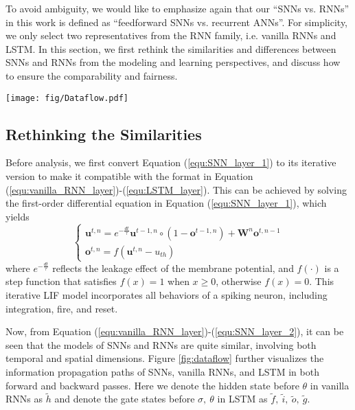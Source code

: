 \documentclass[journal,10pt,twocolumn]{IEEETran}
\begin{document}
To avoid ambiguity, we would like to emphasize again that our ``SNNs vs. RNNs'' in this work is defined as ``feedforward SNNs vs. recurrent ANNs''. For simplicity, we only select two representatives from the RNN family, i.e. vanilla RNNs and LSTM. In this section, we first rethink the similarities and differences between SNNs and RNNs from the modeling and learning perspectives, and discuss how to ensure the comparability and fairness.

\begin{figure*}[!htbp]
\centering     
\texttt{[image: fig/Dataflow.pdf]}
\vspace{-10pt}
\caption{\textbf{Information propagation paths of (a) SNNs, (b) vanilla RNNs, and (c) LSTM in both forward and backward passes.} For clarity, we do not show the dataflow inside LSTM neurons.}
\label{fig:dataflow} 
\end{figure*}

\subsection{Rethinking the Similarities}

Before analysis, we first convert Equation (\ref{equ:SNN_layer_1}) to its iterative version to make it compatible with the format in Equation (\ref{equ:vanilla_RNN_layer})-(\ref{equ:LSTM_layer}). This can be achieved by solving the first-order differential equation in Equation (\ref{equ:SNN_layer_1}), which yields
\begin{equation}
    \label{equ:SNN_layer_2}
    \begin{cases}
    \pmb{u}^{t,n}= e^{-\frac{dt}{\tau}}\pmb{u}^{t-1,n}\circ(1-\pmb{o}^{t-1,n}) + \pmb{W}^{n}\pmb{o}^{t,n-1} \\
    \pmb{o}^{t,n}= f(\pmb{u}^{t,n}-u_{th})
    \end{cases}
\end{equation}
where $e^{-\frac{dt}{\tau}}$ reflects the leakage effect of the membrane potential, and $f(\cdot)$ is a step function that satisfies $f(x)=1$ when $x\geq 0$, otherwise $f(x)=0$. This iterative LIF model incorporates all behaviors of a spiking neuron, including integration, fire, and reset. 

Now, from Equation (\ref{equ:vanilla_RNN_layer})-(\ref{equ:SNN_layer_2}), it can be seen that the models of SNNs and RNNs are quite similar, involving both temporal and spatial dimensions. Figure \ref{fig:dataflow} further visualizes the information propagation paths of SNNs, vanilla RNNs, and LSTM in both forward and backward passes. Here we denote the hidden state before $\theta$ in vanilla RNNs as $\tilde{h}$ and denote the gate states before $\sigma,~\theta$ in LSTM as $\tilde{f},~\tilde{i},~\tilde{o},~\tilde{g}$. 
\end{document}
